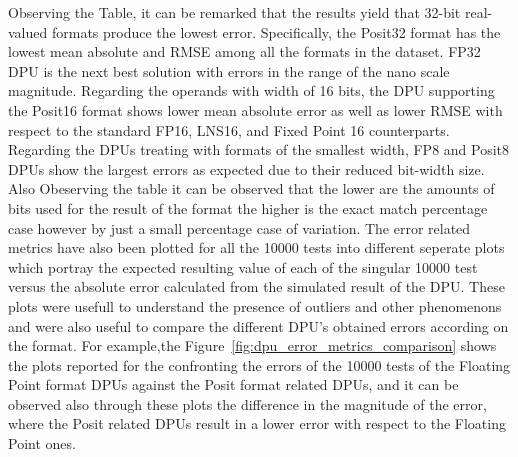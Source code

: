 Observing the Table, it can be remarked that the results yield that 32-bit real-valued formats produce the lowest error. Specifically, the Posit32 format has the lowest mean absolute and RMSE among all the formats in the dataset. FP32 DPU is the next best solution with errors in the range of the nano scale magnitude. Regarding the operands with width of 16 bits, the DPU supporting the Posit16 format shows lower mean absolute error as well as lower RMSE with respect to the standard FP16, LNS16, and Fixed Point 16 counterparts. Regarding the DPUs treating with formats of the smallest width, FP8 and Posit8 DPUs show the largest errors as expected due to their reduced bit-width size. Also Obeserving the table it can be observed that the lower are the amounts of bits used for the result of the format the higher is the exact match percentage case however by just a small percentage case of variation. The error related metrics have also been plotted for all the 10000 tests into different seperate plots which portray the expected resulting value of each of the singular 10000 test versus the absolute error calculated from the simulated result of the DPU. These plots were usefull to understand the presence of outliers and other phenomenons and were also useful to compare the different DPU's obtained errors according on the format. For example,the Figure~\ref{fig:dpu_error_metrics_comparison} shows the plots reported for the confronting the errors of the 10000 tests of the Floating Point format DPUs against the Posit format related DPUs, and it can be observed also through these plots the difference in the magnitude of the error, where the Posit related DPUs result in a lower error with respect to the Floating Point ones. 

